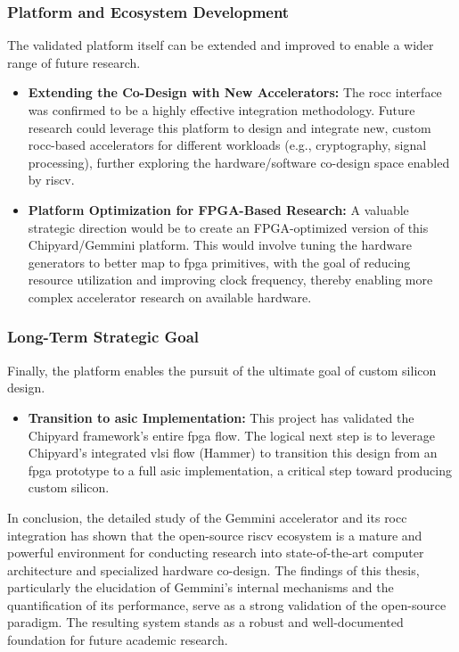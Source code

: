 \subsubsection{Platform and Ecosystem Development}
The validated platform itself can be extended and improved to enable a wider range of future research.
\begin{itemize}
    \item \textbf{Extending the Co-Design with New Accelerators:} The \acrshort{rocc} interface was confirmed to be a highly effective integration methodology. Future research could leverage this platform to design and integrate new, custom \acrshort{rocc}-based accelerators for different workloads (e.g., cryptography, signal processing), further exploring the hardware/software co-design space enabled by \acrshort{riscv}.

    \item \textbf{Platform Optimization for FPGA-Based Research:} A valuable strategic direction would be to create an FPGA-optimized version of this Chipyard/Gemmini platform. This would involve tuning the hardware generators to better map to \acrshort{fpga} primitives, with the goal of reducing resource utilization and improving clock frequency, thereby enabling more complex accelerator research on available hardware.
\end{itemize}

\subsubsection{Long-Term Strategic Goal}
Finally, the platform enables the pursuit of the ultimate goal of custom silicon design.
\begin{itemize}
    \item \textbf{Transition to \acrshort{asic} Implementation:} This project has validated the Chipyard framework's entire \acrshort{fpga} flow. The logical next step is to leverage Chipyard's integrated \acrshort{vlsi} flow (Hammer) to transition this design from an \acrshort{fpga} prototype to a full \acrshort{asic} implementation, a critical step toward producing custom silicon.
\end{itemize}

In conclusion, the detailed study of the Gemmini accelerator and its \acrshort{rocc} integration has shown that the open-source \acrshort{riscv} ecosystem is a mature and powerful environment for conducting research into state-of-the-art computer architecture and specialized hardware co-design. The findings of this thesis, particularly the elucidation of Gemmini's internal mechanisms and the quantification of its performance, serve as a strong validation of the open-source paradigm. The resulting system stands as a robust and well-documented foundation for future academic research.